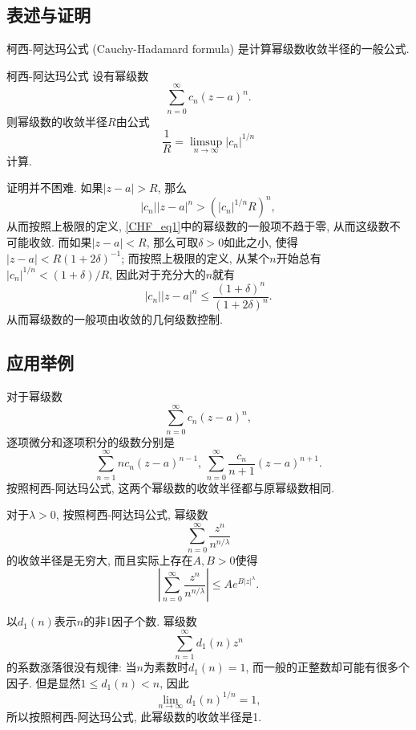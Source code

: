 
\subsection{表述与证明}

柯西-阿达玛公式 (Cauchy-Hadamard formula) 是计算幂级数收敛半径的一般公式.

\begin{theorem}{柯西-阿达玛公式}
设有幂级数
\begin{equation}\label{CHF_eq1}
\sum_{n=0}^\infty c_n(z-a)^n.
\end{equation}
则幂级数的收敛半径$R$由公式
$$
\frac{1}{R}=\limsup_{n\to\infty}|c_n|^{1/n}
$$
计算.
\end{theorem}
证明并不困难. 如果$|z-a|>R$, 那么
$$
|c_n||z-a|^n>(|c_n|^{1/n}R)^n,
$$
从而按照上极限的定义, \autoref{CHF_eq1}中的幂级数的一般项不趋于零, 从而这级数不可能收敛. 而如果$|z-a|<R$, 那么可取$\delta>0$如此之小, 使得$|z-a|<R(1+2\delta)^{-1}$; 而按照上极限的定义, 从某个$n$开始总有$|c_n|^{1/n}<(1+\delta)/R$, 因此对于充分大的$n$就有
$$
|c_n||z-a|^n\leq\frac{(1+\delta)^n}{(1+2\delta)^n}.
$$
从而幂级数的一般项由收敛的几何级数控制.

\subsection{应用举例}
对于幂级数
$$
\sum_{n=0}^\infty c_n(z-a)^n,
$$
逐项微分和逐项积分的级数分别是
$$
\sum_{n=1}^\infty nc_n(z-a)^{n-1},\,
\sum_{n=0}^\infty \frac{c_n}{n+1}(z-a)^{n+1}.
$$
按照柯西-阿达玛公式, 这两个幂级数的收敛半径都与原幂级数相同.

对于$\lambda>0$, 按照柯西-阿达玛公式, 幂级数
$$
\sum_{n=0}^\infty\frac{z^n}{n^{n/\lambda}}
$$
的收敛半径是无穷大, 而且实际上存在$A,B>0$使得
$$
\left|\sum_{n=0}^\infty\frac{z^n}{n^{n/\lambda}}\right|
\leq Ae^{B|z|^\lambda}.
$$

以$d_1(n)$表示$n$的非1因子个数. 幂级数
$$
\sum_{n=1}^\infty d_1(n)z^n
$$
的系数涨落很没有规律: 当$n$为素数时$d_1(n)=1$, 而一般的正整数却可能有很多个因子. 但是显然$1\leq d_1(n)<n$, 因此
$$
\lim_{n\to\infty}d_1(n)^{1/n}=1,
$$
所以按照柯西-阿达玛公式, 此幂级数的收敛半径是1.